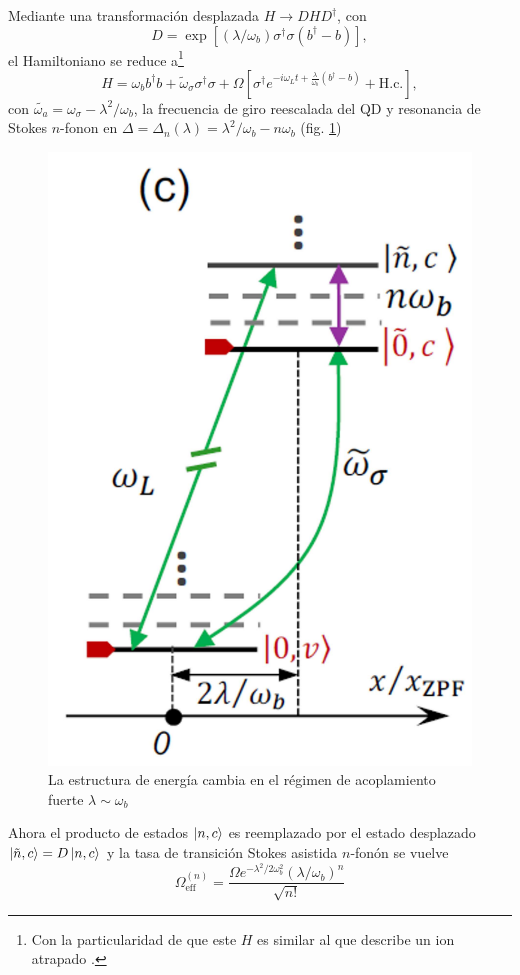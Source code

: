 \documentclass[main.tex]{subfiles}
\begin{document}
Mediante una transformación desplazada $H \to DHD^\dagger$, con 
\begin{equation}
	D = \exp[(\lambda/\omega_b)\sigma^\dagger \sigma(b^\dagger - b)],
\end{equation}
el Hamiltoniano se reduce a\footnote{Con la particularidad de que este $H$ es similar al que describe un ion atrapado \parencite{Blockley1992}.}
\begin{equation}
	H = \omega_b b^\dagger b + \tilde{\omega}_\sigma \sigma^\dagger \sigma + \Omega[\sigma^\dagger e^{-i\omega_L t + \frac{\lambda}{\omega_b}(b^\dagger-b)} + \text{H.c.}],
\end{equation}
con $\tilde{\omega_a} = \omega_\sigma - \lambda^2/\omega_b$, la frecuencia de giro reescalada del QD y resonancia de Stokes $n$-fonon en $\Delta = \Delta_n(\lambda) = \lambda^2/\omega_b - n\omega_b$ (fig. \ref{fig:resonancesstokes2})

\begin{figure}[th]
	\centering
	\includegraphics[width=0.25\linewidth]{img/resonancesStokes2}
	\caption{La estructura de energía cambia en el régimen de acoplamiento fuerte $\lambda \sim \omega_b$ \parencite{Bin2020}}
	\label{fig:resonancesstokes2}
\end{figure}

Ahora el producto de estados $\ket{n,c}$ es reemplazado por el estado desplazado $\ket{\tilde{n}, c} = D\ket{n,c}$ y la tasa de transición Stokes asistida $n$-fonón se vuelve \parencite{Bin2020}
\begin{equation}\label{eq:effRabi2}
	\Omega_\text{eff}^{(n)} = \frac{\Omega e^{-\lambda^2/2\omega_b^2}(\lambda/\omega_b)^n}{\sqrt{n!}}
\end{equation}
\end{document}
